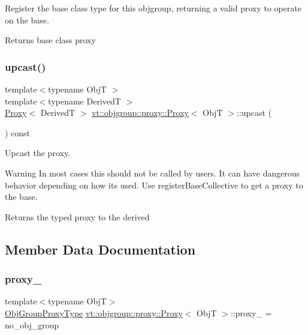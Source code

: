 Register the base class type for this objgroup, returning a valid proxy to operate on the base. 

\begin{DoxyReturn}{Returns}
base class proxy 
\end{DoxyReturn}
\mbox{\label{structvt_1_1objgroup_1_1proxy_1_1_proxy_a10217747f1bdd8b59e6f5f76290de8e0}} 
\subsubsection{\texorpdfstring{upcast()}{upcast()}}
{\footnotesize\ttfamily template$<$typename ObjT $>$ \\
template$<$typename DerivedT $>$ \\
\hyperlink{structvt_1_1objgroup_1_1proxy_1_1_proxy}{Proxy}$<$ DerivedT $>$ \hyperlink{structvt_1_1objgroup_1_1proxy_1_1_proxy}{vt\+::objgroup\+::proxy\+::\+Proxy}$<$ ObjT $>$\+::upcast (\begin{DoxyParamCaption}{ }\end{DoxyParamCaption}) const}



Upcast the proxy. 

\begin{DoxyWarning}{Warning}
In most cases this should not be called by users. It can have dangerous behavior depending on how its used. Use {\ttfamily register\+Base\+Collective} to get a proxy to the base.
\end{DoxyWarning}
\begin{DoxyReturn}{Returns}
the typed proxy to the derived 
\end{DoxyReturn}


\subsection{Member Data Documentation}
\mbox{\label{structvt_1_1objgroup_1_1proxy_1_1_proxy_a4411a5c2a4719d264060041fd15d9d03}} 
\subsubsection{\texorpdfstring{proxy\+\_\+}{proxy\_}}
{\footnotesize\ttfamily template$<$typename ObjT$>$ \\
\hyperlink{namespacevt_ad7cae989df485fccca57f0792a880a8e}{Obj\+Group\+Proxy\+Type} \hyperlink{structvt_1_1objgroup_1_1proxy_1_1_proxy}{vt\+::objgroup\+::proxy\+::\+Proxy}$<$ ObjT $>$\+::proxy\+\_\+ = no\+\_\+obj\+\_\+group\hspace{0.3cm}{\ttfamily [private]}}


